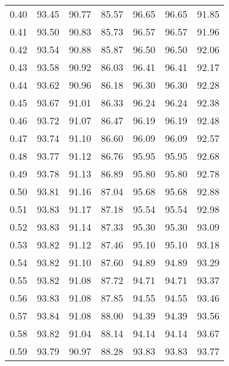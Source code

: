 \begin{tabular}{|c|c|c|c|c|c|c|}
      0.40 &     93.45 &     90.77 &      85.57 &   96.65 &      96.65 &         91.85 \\
      0.41 &     93.50 &     90.83 &      85.73 &   96.57 &      96.57 &         91.96 \\
      0.42 &     93.54 &     90.88 &      85.87 &   96.50 &      96.50 &         92.06 \\
      0.43 &     93.58 &     90.92 &      86.03 &   96.41 &      96.41 &         92.17 \\
      0.44 &     93.62 &     90.96 &      86.18 &   96.30 &      96.30 &         92.28 \\
      0.45 &     93.67 &     91.01 &      86.33 &   96.24 &      96.24 &         92.38 \\
      0.46 &     93.72 &     91.07 &      86.47 &   96.19 &      96.19 &         92.48 \\
      0.47 &     93.74 &     91.10 &      86.60 &   96.09 &      96.09 &         92.57 \\
      0.48 &     93.77 &     91.12 &      86.76 &   95.95 &      95.95 &         92.68 \\
      0.49 &     93.78 &     91.13 &      86.89 &   95.80 &      95.80 &         92.78 \\
      0.50 &     93.81 &     91.16 &      87.04 &   95.68 &      95.68 &         92.88 \\
      0.51 &     93.83 &     91.17 &      87.18 &   95.54 &      95.54 &         92.98 \\
      0.52 &     93.83 &     91.14 &      87.33 &   95.30 &      95.30 &         93.09 \\
      0.53 &     93.82 &     91.12 &      87.46 &   95.10 &      95.10 &         93.18 \\
      0.54 &     93.82 &     91.10 &      87.60 &   94.89 &      94.89 &         93.29 \\
      0.55 &     93.82 &     91.08 &      87.72 &   94.71 &      94.71 &         93.37 \\
      0.56 &     93.83 &     91.08 &      87.85 &   94.55 &      94.55 &         93.46 \\
      0.57 &     93.84 &     91.08 &      88.00 &   94.39 &      94.39 &         93.56 \\
      0.58 &     93.82 &     91.04 &      88.14 &   94.14 &      94.14 &         93.67 \\
      0.59 &     93.79 &     90.97 &      88.28 &   93.83 &      93.83 &         93.77 \\

\end{tabular}
